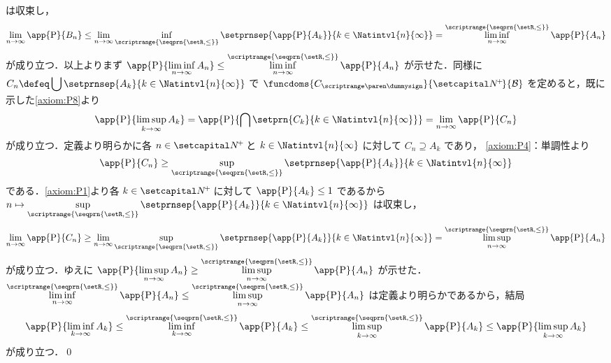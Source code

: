 \documentclass[a4paper,dvipdfmx,leqno]{jsarticle}
\begin{document}
{{        は収束し，
        \begin{align*}
          \lim_{n \to \infty} \app{\Prob}{B_{n}}
            \leq \lim_{n \to \infty} \inf_{\scriptrange{\seqprn{\setR, \leq}}} \setprnsep{\app{\Prob}{A_{k}}}{k \in \Natintvl{n}{\infty}}
              = \liminf_{n \to \infty}^{\scriptrange{\seqprn{\setR, \leq}}} \app{\Prob}{A_{n}}
        \end{align*}
        が成り立つ\QUESTION ．以上よりまず
        $\displaystyle \app{\Prob}{\liminf_{n \to \infty} A_{n}}
          \leq \liminf_{n \to \infty}^{\scriptrange{\seqprn{\setR, \leq}}} \app{\Prob}{A_{n}}$
        が示せた．同様に $\displaystyle C_{n} \defeq \bigcup \setprnsep{A_{k}}{k \in \Natintvl{n}{\infty}}$ で
        $\funcdoms{C_{\dummysub}}{\setNpos}{\famB}$ を定めると，既に示した\eqref{axiom:P8}より
        \begin{align*}
          \app{\Prob}{\limsup_{k \to \infty} A_{k}}
            = \app{\Prob}{\bigcap \setprn{C_{k}}{k \in \Natintvl{n}{\infty}}}
              = \lim_{n \to \infty} \app{\Prob}{C_{n}}
        \end{align*}
        が成り立つ．定義より明らかに各 $n \in \setNpos$ と $k \in \Natintvl{n}{\infty}$ に対して $C_{n} \supseteq A_{k}$ であり，
        \eqref{axiom:P4}：単調性より
        \begin{align*}
          \app{\Prob}{C_{n}} \geq \sup_{\scriptrange{\seqprn{\setR, \leq}}} \setprnsep{\app{\Prob}{A_{k}}}{k \in \Natintvl{n}{\infty}}
        \end{align*}
        である．\eqref{axiom:P1}より各 $k \in \setNpos$ に対して $\app{\Prob}{A_{k}} \leq 1$ であるから
        $\displaystyle n \mapsto \sup_{\scriptrange{\seqprn{\setR, \leq}}} \setprnsep{\app{\Prob}{A_{k}}}{k \in \Natintvl{n}{\infty}}$
        は収束し，
        \begin{align*}
          \lim_{n \to \infty} \app{\Prob}{C_{n}}
            \geq \lim_{n \to \infty} \sup_{\scriptrange{\seqprn{\setR, \leq}}} \setprnsep{\app{\Prob}{A_{k}}}{k \in \Natintvl{n}{\infty}}
              = \limsup_{n \to \infty}^{\scriptrange{\seqprn{\setR, \leq}}} \app{\Prob}{A_{n}}
        \end{align*}
        が成り立つ\QUESTION ．ゆえに
        $\displaystyle \app{\Prob}{\limsup_{n \to \infty} A_{n}}
          \geq \limsup_{n \to \infty}^{\scriptrange{\seqprn{\setR, \leq}}} \app{\Prob}{A_{n}}$
        が示せた．
        $\displaystyle \liminf_{n \to \infty}^{\scriptrange{\seqprn{\setR, \leq}}} \app{\Prob}{A_{n}} \leq
          \limsup_{n \to \infty}^{\scriptrange{\seqprn{\setR, \leq}}} \app{\Prob}{A_{n}}$
        は定義より明らかであるから，結局
        \begin{align*}
          \app{\Prob}{\liminf_{k \to \infty} A_{k}}
            \leq \liminf_{k \to \infty}^{\scriptrange{\seqprn{\setR, \leq}}} \app{\Prob}{A_{k}}
              \leq \limsup_{k \to \infty}^{\scriptrange{\seqprn{\setR, \leq}}} \app{\Prob}{A_{k}}
                \leq \app{\Prob}{\limsup_{k \to \infty} A_{k}}
        \end{align*}
        が成り立つ．\qed
      }
    }
\end{document}
